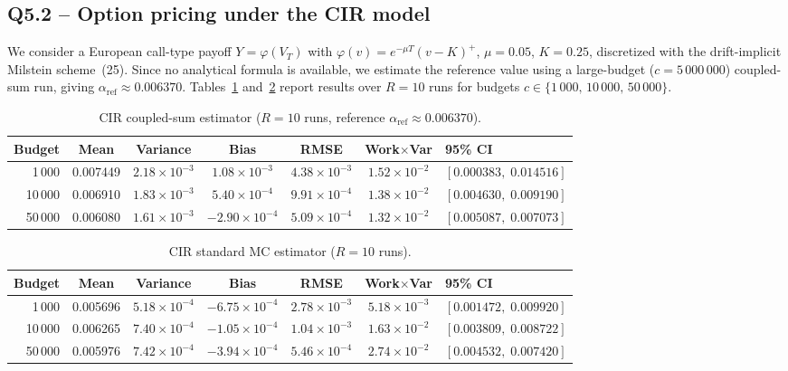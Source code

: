 \documentclass[11pt, a4paper]{article}
\begin{document}
\subsection*{Q5.2 -- Option pricing under the CIR model}

We consider a European call-type payoff $Y=\varphi(V_T)$ with
$\varphi(v)=e^{-\mu T}(v-K)^+$, $\mu=0.05$, $K=0.25$, discretized with the
drift-implicit Milstein scheme~(25).
Since no analytical formula is available, we estimate the reference value using a
large-budget ($c=5\,000\,000$) coupled-sum run, giving $\alpha_{\mathrm{ref}}\approx 0.006370$.
Tables~\ref{tab:q52cs} and~\ref{tab:q52smc} report results over $R=10$ runs for
budgets $c\in\{1\,000,\,10\,000,\,50\,000\}$.

\begin{table}[H]
\centering
\begin{tabular}{rcccccl}
\toprule
Budget & Mean & Variance & Bias & RMSE & Work$\times$Var & 95\% CI \\
\midrule
  1\,000 & 0.007449 & $2.18\times10^{-3}$ & $1.08\times10^{-3}$ & $4.38\times10^{-3}$ & $1.52\times10^{-2}$ & $[0.000383,\;0.014516]$ \\
 10\,000 & 0.006910 & $1.83\times10^{-3}$ & $5.40\times10^{-4}$ & $9.91\times10^{-4}$ & $1.38\times10^{-2}$ & $[0.004630,\;0.009190]$ \\
 50\,000 & 0.006080 & $1.61\times10^{-3}$ & $-2.90\times10^{-4}$ & $5.09\times10^{-4}$ & $1.32\times10^{-2}$ & $[0.005087,\;0.007073]$ \\
\bottomrule
\end{tabular}
\caption{CIR coupled-sum estimator ($R=10$ runs, reference $\alpha_{\mathrm{ref}}\approx 0.006370$).}
\label{tab:q52cs}
\end{table}

\begin{table}[H]
\centering
\begin{tabular}{rcccccl}
\toprule
Budget & Mean & Variance & Bias & RMSE & Work$\times$Var & 95\% CI \\
\midrule
  1\,000 & 0.005696 & $5.18\times10^{-4}$ & $-6.75\times10^{-4}$ & $2.78\times10^{-3}$ & $5.18\times10^{-3}$ & $[0.001472,\;0.009920]$ \\
 10\,000 & 0.006265 & $7.40\times10^{-4}$ & $-1.05\times10^{-4}$ & $1.04\times10^{-3}$ & $1.63\times10^{-2}$ & $[0.003809,\;0.008722]$ \\
 50\,000 & 0.005976 & $7.42\times10^{-4}$ & $-3.94\times10^{-4}$ & $5.46\times10^{-4}$ & $2.74\times10^{-2}$ & $[0.004532,\;0.007420]$ \\
\bottomrule
\end{tabular}
\caption{CIR standard MC estimator ($R=10$ runs).}
\label{tab:q52smc}
\end{table}
\end{document}
